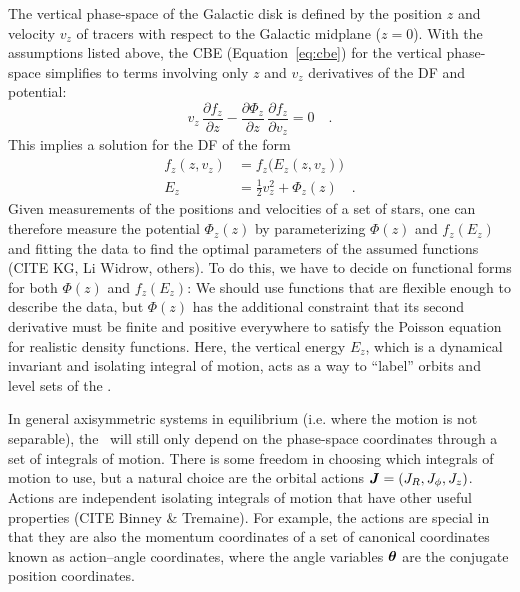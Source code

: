 

The vertical phase-space of the Galactic disk is defined by the position $z$ and
velocity $v_z$ of tracers with respect to the Galactic midplane ($z=0$).
With the assumptions listed above, the CBE (Equation~\ref{eq:cbe}) for the vertical
phase-space simplifies to terms involving only $z$ and $v_z$ derivatives of the DF and
potential:
\begin{equation}
    v_z \, \frac{\partial f_z}{\partial z} - \frac{\partial \Phi_z}{\partial z} \, \frac{\partial f_z}{\partial v_z} = 0 \quad .
    \label{eq:cbe-1d}
\end{equation}
This implies a solution for the DF of the form
\begin{align}
    f_z(z, v_z) &= f_z\Big(E_z(z, v_z)\Big)\\
    E_z &= \frac{1}{2} v_z^2 + \Phi_z(z) \quad .
\end{align}
Given measurements of the positions and velocities of a set of stars, one can therefore
measure the potential $\Phi_z(z)$ by parameterizing $\Phi(z)$ and $f_z(E_z)$ and fitting
the data to find the optimal parameters of the assumed functions (CITE KG, Li Widrow,
others).
To do this, we have to decide on functional forms for both $\Phi(z)$ and $f_z(E_z)$: We
should use functions that are flexible enough to describe the data, but $\Phi(z)$ has
the additional constraint that its second derivative must be finite and positive
everywhere to satisfy the Poisson equation for realistic density functions.
Here, the vertical energy $E_z$, which is a dynamical invariant and isolating integral
of motion, acts as a way to ``label'' orbits and level sets of the \df.

In general axisymmetric systems in equilibrium (i.e. where the motion is not separable),
the \df\ will still only depend on the phase-space coordinates through a set of
integrals of motion.
There is some freedom in choosing which integrals of motion to use, but a natural choice
are the orbital actions $\boldsymbol{J}=(J_R, J_\phi, J_z)$.
Actions are independent isolating integrals of motion that have other useful properties
(CITE Binney \& Tremaine).
For example, the actions are special in that they are also the momentum coordinates of a
set of canonical coordinates known as action--angle coordinates, where the angle
variables $\boldsymbol{\theta}$ are the conjugate position coordinates.

